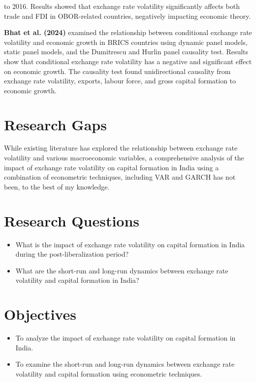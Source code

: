 \documentclass{article} %
\begin{document}
to 2016. Results showed that exchange rate volatility significantly affects both trade and FDI in
OBOR-related countries, negatively impacting economic theory.
\par
\textbf{Bhat et al. (2024)} examined the relationship between conditional exchange rate volatility and
economic growth in BRICS countries using dynamic panel models, static panel models, and the
Dumitrescu and Hurlin panel causality test. Results show that conditional exchange rate
volatility has a negative and significant effect on economic growth. The causality test found
unidirectional causality from exchange rate volatility, exports, labour force, and gross capital
formation to economic growth.


\section{Research Gaps}
While existing literature has explored the relationship between exchange rate volatility and various
macroeconomic variables, a comprehensive analysis of the impact of exchange rate volatility on
capital formation in India using a combination of econometric techniques, including VAR and
GARCH has not been, to the best of my knowledge.

\section{Research Questions}
\begin{itemize}
    \item What is the impact of exchange rate volatility on capital formation in India during the post-liberalization period?
    \item What are the short-run and long-run dynamics between exchange rate volatility and capital formation in India?
\end{itemize}

\section{Objectives}
\begin{itemize}
    \item To analyze the impact of exchange rate volatility on capital formation in India.
    \item To examine the short-run and long-run dynamics between exchange rate volatility and capital formation using econometric techniques.
\end{itemize}
\end{document}

